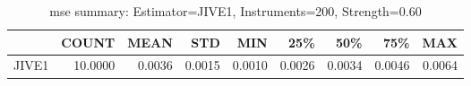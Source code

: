 \begin{table}[ht]
\centering
\caption{mse summary: Estimator=JIVE1, Instruments=200, Strength=0.60}
\begin{tabular}{lrrrrrrrr}
\toprule
 & COUNT & MEAN & STD & MIN & 25\% & 50\% & 75\% & MAX \\
\midrule
JIVE1 & 10.0000 & 0.0036 & 0.0015 & 0.0010 & 0.0026 & 0.0034 & 0.0046 & 0.0064 \\
\bottomrule
\end{tabular}
\end{table}
